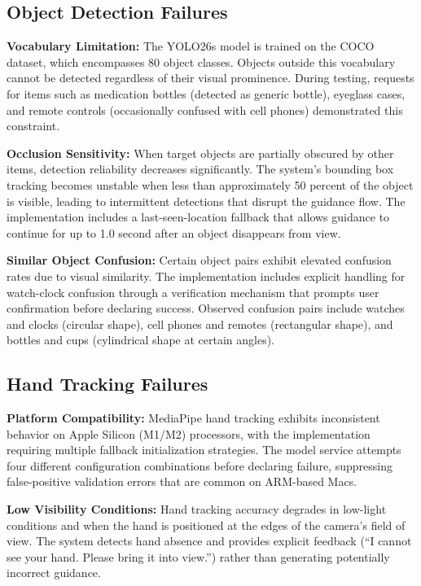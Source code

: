 \documentclass[12pt,a4paper]{report}
\begin{document}
\subsection{Object Detection Failures}

\textbf{Vocabulary Limitation:} The YOLO26s model is trained on the COCO dataset, which encompasses 80 object classes. Objects outside this vocabulary cannot be detected regardless of their visual prominence. During testing, requests for items such as medication bottles (detected as generic bottle), eyeglass cases, and remote controls (occasionally confused with cell phones) demonstrated this constraint.

\textbf{Occlusion Sensitivity:} When target objects are partially obscured by other items, detection reliability decreases significantly. The system's bounding box tracking becomes unstable when less than approximately 50 percent of the object is visible, leading to intermittent detections that disrupt the guidance flow. The implementation includes a last-seen-location fallback that allows guidance to continue for up to 1.0 second after an object disappears from view.

\textbf{Similar Object Confusion:} Certain object pairs exhibit elevated confusion rates due to visual similarity. The implementation includes explicit handling for watch-clock confusion through a verification mechanism that prompts user confirmation before declaring success. Observed confusion pairs include watches and clocks (circular shape), cell phones and remotes (rectangular shape), and bottles and cups (cylindrical shape at certain angles).

\subsection{Hand Tracking Failures}

\textbf{Platform Compatibility:} MediaPipe hand tracking exhibits inconsistent behavior on Apple Silicon (M1/M2) processors, with the implementation requiring multiple fallback initialization strategies. The model service attempts four different configuration combinations before declaring failure, suppressing false-positive validation errors that are common on ARM-based Macs.

\textbf{Low Visibility Conditions:} Hand tracking accuracy degrades in low-light conditions and when the hand is positioned at the edges of the camera's field of view. The system detects hand absence and provides explicit feedback (``I cannot see your hand. Please bring it into view.'') rather than generating potentially incorrect guidance.
\end{document}
